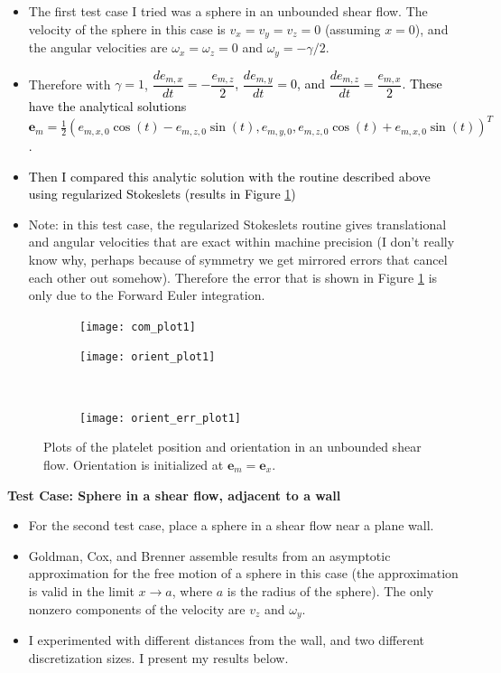 \documentclass{article}
\newcommand{\vect}[1]{\boldsymbol{\mathbf{#1}}}
\begin{document}
{\color{gray}
\begin{itemize}
\item The first test case I tried was a sphere in an unbounded shear
  flow. The velocity of the sphere in this case is $v_x = v_y = v_z =
  0$ (assuming $x = 0$), and the angular velocities are $\omega_x =
  \omega_z = 0$ and $\omega_y = -\gamma/2$.
\item Therefore with $\gamma = 1$,
  \textcolor{black}{$\dfrac{de_{m,x}}{dt} = -\dfrac{e_{m, z}}{2}$,
    $\dfrac{de_{m, y}}{dt} = 0$, and
    $\dfrac{de_{m,z}}{dt} = \dfrac{e_{m,x}}{2}$. These have the
    analytical solutions
    $\vect{e}_m = \frac{1}{2} (e_{m,x,0} \cos(t) - e_{m,z,0} \sin(t),
    e_{m,y,0}, e_{m,z,0} \cos(t) + e_{m,x,0}\sin(t))^T$.}
\item \textcolor{black}{Then I compared this analytic solution with
    the routine described above using regularized Stokeslets (results
    in Figure \ref{fig:com_plot})}
\item Note: in this test case, the regularized Stokeslets routine
  gives translational and angular velocities that are exact within
  machine precision (I don't really know why, perhaps because of
  symmetry we get mirrored errors that cancel each other out
  somehow). Therefore the error that is shown in Figure
  \ref{fig:com_plot} is only due to the Forward Euler integration. 
\end{itemize}
}

\begin{figure}
  \centering
  \begin{subfigure}{0.49\textwidth}
    \texttt{[image: com\_plot1]}
  \end{subfigure}
  \hfill
  \begin{subfigure}{0.49\textwidth}
    \texttt{[image: orient\_plot1]}
  \end{subfigure}
  \\
  \begin{subfigure}{0.49\textwidth}
    \texttt{[image: orient\_err\_plot1]}
  \end{subfigure}
  \caption{Plots of the platelet position and orientation in an
    unbounded shear flow. Orientation is initialized at
    $\vect{e}_m = \vect{e}_x$.}
  \label{fig:com_plot}
\end{figure}

\newpage

\textbf{Test Case: Sphere in a shear flow, adjacent to a wall}

\begin{itemize}
\item For the second test case, place a sphere in a shear flow near a
  plane wall.
\item Goldman, Cox, and Brenner \cite{Goldman1967b} assemble results
  from an asymptotic approximation for the free motion of a sphere in
  this case (the approximation is valid in the limit
  $x \rightarrow a$, where $a$ is the radius of the sphere). The only
  nonzero components of the velocity are $v_z$ and $\omega_y$.
\item I experimented with different distances from the wall, and two
  different discretization sizes. I present my results below.
\end{itemize}
\end{document}
